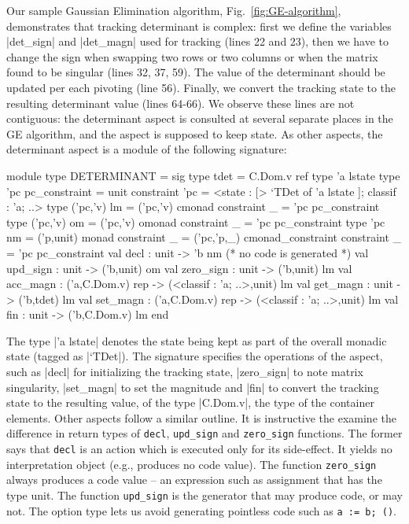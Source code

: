 \documentclass{elsart}
\newcommand{\oleg}[1]{{\it [Oleg says: #1]}}
\newcommand{\jacques}[1]{{\it [Jacques says: #1]}}
\begin{document}
Our sample Gaussian Elimination algorithm, Fig.~\ref{fig:GE-algorithm},
demonstrates that tracking determinant is complex: first we define the
variables |det_sign| and |det_magn| used for tracking (lines 22 and
23), then we have to change the sign when swapping two rows or two
columns or when the matrix found to be singular (lines 32, 37, 59).
The value of the determinant should be updated per each pivoting (line
56). Finally, we convert the tracking state to the resulting
determinant value (lines 64-66). We observe these lines are not
contiguous: the determinant aspect is consulted at several separate
places in the GE algorithm, and the aspect is supposed to keep
state. As other aspects, the determinant aspect is a module of the
following signature:
\begin{code}
module type DETERMINANT = sig
  type tdet = C.Dom.v ref
  type 'a lstate
  type 'pc pc_constraint = unit
    constraint 'pc = <state : [> `TDet of 'a lstate ]; classif : 'a; ..>
  type ('pc,'v) lm = ('pc,'v) cmonad
    constraint _  = 'pc pc_constraint
  type ('pc,'v) om = ('pc,'v) omonad
    constraint _  = 'pc pc_constraint
  type 'pc nm = ('p,unit) monad
    constraint _ = ('pc,'p,_) cmonad_constraint
    constraint _ = 'pc pc_constraint
  val decl : unit -> 'b nm (* no code is generated *)
  val upd_sign  : unit -> ('b,unit) om
  val zero_sign : unit -> ('b,unit) lm
  val acc_magn  : ('a,C.Dom.v) rep -> (<classif : 'a; ..>,unit) lm
  val get_magn  : unit -> ('b,tdet) lm
  val set_magn  : ('a,C.Dom.v) rep -> (<classif : 'a; ..>,unit) lm
  val fin       : unit -> ('b,C.Dom.v) lm
end
\end{code}
The type |'a lstate| denotes the state being kept as part of the
overall monadic state (tagged as |`TDet|). The signature specifies the
operations of the aspect, such as |decl| for initializing the tracking
state, |zero_sign| to note matrix singularity, |set_magn| to set the
magnitude and |fin| to convert the tracking state to the resulting
value, of  the type |C.Dom.v|, the type of the container
elements. Other aspects follow a similar outline.
It is instructive the examine the difference in return types of \texttt{decl},
\texttt{upd\_sign} and \texttt{zero\_sign} functions. The former says
that \texttt{decl} is an action which is executed only for its
side-effect. It yields no interpretation object (e.g., produces no
code value). The function \texttt{zero\_sign} always produces a code
value -- an expression such as assignment that has the type unit. 
The function
\texttt{upd\_sign} is the generator that may produce code, or may
not. The option type lets us avoid generating pointless code such as 
\texttt{a := b; ()}.
\end{document}
